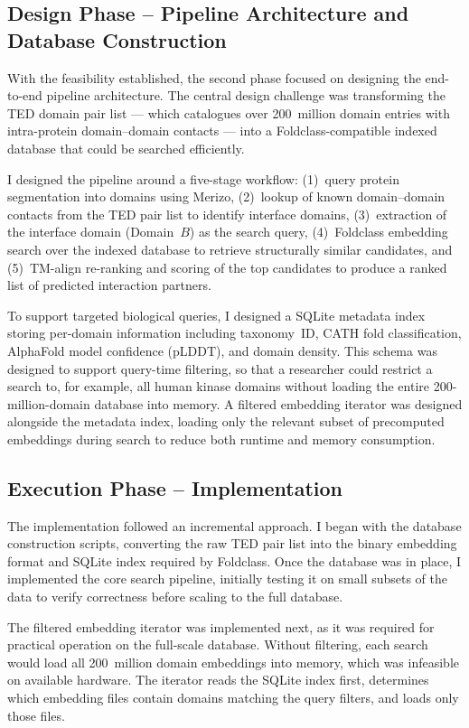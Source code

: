\subsection{Design Phase -- Pipeline Architecture and Database Construction}

With the feasibility established, the second phase focused on designing the end-to-end pipeline architecture.
The central design challenge was transforming the TED domain pair list --- which catalogues over 200~million domain entries with intra-protein domain--domain contacts --- into a Foldclass-compatible indexed database that could be searched efficiently.

I designed the pipeline around a five-stage workflow: (1)~query protein segmentation into domains using Merizo, (2)~lookup of known domain--domain contacts from the TED pair list to identify interface domains, (3)~extraction of the interface domain (Domain~$B$) as the search query, (4)~Foldclass embedding search over the indexed database to retrieve structurally similar candidates, and (5)~TM-align re-ranking and scoring of the top candidates to produce a ranked list of predicted interaction partners.

To support targeted biological queries, I designed a SQLite metadata index storing per-domain information including taxonomy~ID, CATH fold classification, AlphaFold model confidence (pLDDT), and domain density.
This schema was designed to support query-time filtering, so that a researcher could restrict a search to, for example, all human kinase domains without loading the entire 200-million-domain database into memory.
A filtered embedding iterator was designed alongside the metadata index, loading only the relevant subset of precomputed embeddings during search to reduce both runtime and memory consumption.

\subsection{Execution Phase -- Implementation}

The implementation followed an incremental approach.
I began with the database construction scripts, converting the raw TED pair list into the binary embedding format and SQLite index required by Foldclass.
Once the database was in place, I implemented the core search pipeline, initially testing it on small subsets of the data to verify correctness before scaling to the full database.

The filtered embedding iterator was implemented next, as it was required for practical operation on the full-scale database.
Without filtering, each search would load all 200~million domain embeddings into memory, which was infeasible on available hardware.
The iterator reads the SQLite index first, determines which embedding files contain domains matching the query filters, and loads only those files.

